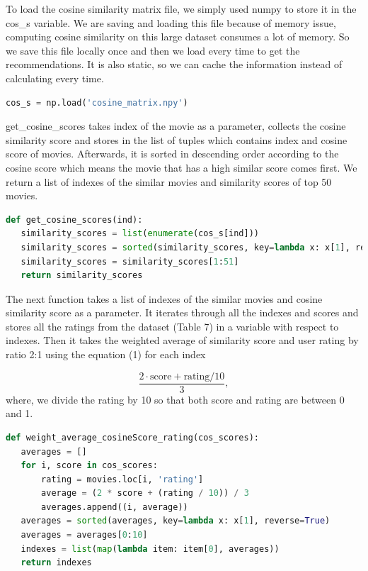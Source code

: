 To load the cosine similarity matrix file, we simply used numpy to store it in the cos\_s variable. We are saving and loading this file because of memory issue, computing cosine similarity on this large dataset consumes a lot of memory. So we save this file locally once and then we load every time to get the recommendations. It is also static, so we can cache the information instead of calculating every time.

\begin{lstlisting}[language=python]
cos_s = np.load('cosine_matrix.npy')
\end{lstlisting}

get\_cosine\_scores takes index of the movie as a parameter, collects the cosine similarity score and stores in the list of tuples which contains index and cosine score of movies.  Afterwards, it is sorted in descending order according to the cosine score which means the movie that has a high similar score comes first. We return a list of indexes of the similar movies and similarity scores of top 50 movies. 

\begin{lstlisting}[language=python]
def get_cosine_scores(ind):
   similarity_scores = list(enumerate(cos_s[ind]))
   similarity_scores = sorted(similarity_scores, key=lambda x: x[1], reverse=True)
   similarity_scores = similarity_scores[1:51] 
   return similarity_scores
\end{lstlisting}

The next function takes a list of indexes of the similar movies and cosine similarity score as a parameter.  It iterates through all the indexes and scores and stores all the ratings from the dataset (Table 7) in a variable with respect to indexes. Then it takes the weighted average of similarity score and user rating by ratio 2:1 using the equation (1) for each index

\begin{equation}
\frac{2 \cdot \text{score} + \text{rating}/10}{3},
\label{eq:average}
\end{equation}
where, we divide the rating by 10 so that both score and rating are between 0 and 1.

\begin{lstlisting}[language=python]
def weight_average_cosineScore_rating(cos_scores):
   averages = []
   for i, score in cos_scores:
       rating = movies.loc[i, 'rating']
       average = (2 * score + (rating / 10)) / 3
       averages.append((i, average))
   averages = sorted(averages, key=lambda x: x[1], reverse=True)
   averages = averages[0:10]
   indexes = list(map(lambda item: item[0], averages))
   return indexes
\end{lstlisting}

